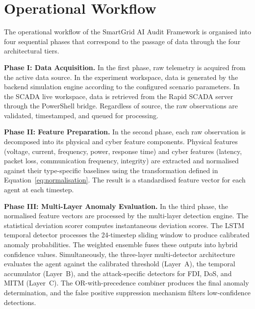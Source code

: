 \section{Operational Workflow}

The operational workflow of the SmartGrid AI Audit Framework is organised into four sequential phases that correspond to the passage of data through the four architectural tiers.

\par \vspace{0.35cm}
\textbf{Phase I: Data Acquisition.} In the first phase, raw telemetry is acquired from the active data source. In the experiment workspace, data is generated by the backend simulation engine according to the configured scenario parameters. In the SCADA live workspace, data is retrieved from the Rapid SCADA server through the PowerShell bridge. Regardless of source, the raw observations are validated, timestamped, and queued for processing.

\par \vspace{0.35cm}
\textbf{Phase II: Feature Preparation.} In the second phase, each raw observation is decomposed into its physical and cyber feature components. Physical features (voltage, current, frequency, power, response time) and cyber features (latency, packet loss, communication frequency, integrity) are extracted and normalised against their type-specific baselines using the transformation defined in Equation~\ref{eq:normalisation}. The result is a standardised feature vector for each agent at each timestep.

\par \vspace{0.35cm}
\textbf{Phase III: Multi-Layer Anomaly Evaluation.} In the third phase, the normalised feature vectors are processed by the multi-layer detection engine. The statistical deviation scorer computes instantaneous deviation scores. The LSTM temporal detector processes the 24-timestep sliding window to produce calibrated anomaly probabilities. The weighted ensemble fuses these outputs into hybrid confidence values. Simultaneously, the three-layer multi-detector architecture evaluates the agent against the calibrated threshold (Layer~A), the temporal accumulator (Layer~B), and the attack-specific detectors for FDI, DoS, and MITM (Layer~C). The OR-with-precedence combiner produces the final anomaly determination, and the false positive suppression mechanism filters low-confidence detections.

